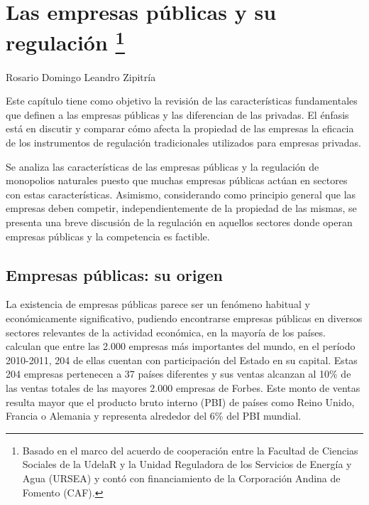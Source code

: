 \documentclass[
  12pt,
  spanish,
]{book}
\begin{document}
\hypertarget{reg-eepp}{%
\chapter[Las empresas públicas y su regulación ]{\texorpdfstring{Las empresas públicas y su regulación \footnote{Basado en el marco del acuerdo de cooperación entre la Facultad de Ciencias Sociales de la UdelaR y la Unidad Reguladora de los Servicios de Energía y Agua (URSEA) y contó con financiamiento de la Corporación Andina de Fomento (CAF).}}{Las empresas públicas y su regulación }}\label{reg-eepp}}

Rosario Domingo
Leandro Zipitría

Este capítulo tiene como objetivo la revisión de las características fundamentales que definen a las empresas públicas y las diferencian de las privadas. El énfasis está en discutir y comparar cómo afecta la propiedad de las empresas la eficacia de los instrumentos de regulación tradicionales utilizados para empresas privadas.

Se analiza las características de las empresas públicas y la regulación de monopolios naturales puesto que muchas empresas públicas actúan en sectores con estas características. Asimismo, considerando como principio general que las empresas deben competir, independientemente de la propiedad de las mismas, se presenta una breve discusión de la regulación en aquellos sectores donde operan empresas públicas y la competencia es factible.

\hypertarget{empresas-puxfablicas-su-origen}{%
\section{Empresas públicas: su origen}\label{empresas-puxfablicas-su-origen}}

La existencia de empresas públicas parece ser un fenómeno habitual y económicamente significativo, pudiendo encontrarse empresas públicas en diversos sectores relevantes de la actividad económica, en la mayoría de los países. \citet{Kowalski2013} calculan que entre las 2.000 empresas más importantes del mundo, en el período 2010-2011, 204 de ellas cuentan con participación del Estado en su capital. Estas 204 empresas pertenecen a 37 países diferentes y sus ventas alcanzan al 10\% de las ventas totales de las mayores 2.000 empresas de Forbes. Este monto de ventas resulta mayor que el producto bruto interno (PBI) de países como Reino Unido, Francia o Alemania y representa alrededor del 6\% del PBI mundial.
\end{document}
